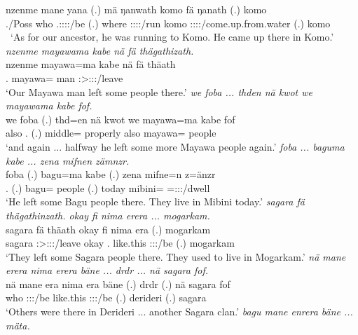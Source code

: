 \begin{exe}
	\gll nzenme mane yana (.) mä ŋanwath komo fä ŋanath (.) komo\\ 
	\Fnsg./Poss{} who \Tsg.\Masc:\Sbj:\Pst:\Ipfv:\Venit/be (.) where \Stpl:\Sbj:\Pst:\Ipfv:\Venit/run komo \Dist{} \Stpl:\Sbj:\Pst:\Ipfv:\Venit/come.up.from.water (.) komo\\\
	\trans `As for our ancestor, he was running to Komo. He came up there in Komo.'
\exi{85} 
	\emph{nzenme mayawama kabe nä fä thägathizath.}\\
	\gll nzenme mayawa=ma kabe nä fä thäath\\ 
	\Fnsg.\Poss{} mayawa=\Char{} man \Indf{} \Dist{} \Stpl:\Sbj>\Stpl:\Obj:\Pst:\Pfv/leave\\
	\trans `Our Mayawa man left some people there.'
	\emph{we foba ... thden nä kwot we mayawama kabe fof.}\\
	\gll we foba (.) thd=en nä kwot we mayawa=ma kabe fof\\ 
	also \Dist.\Abl{} (.) middle=\Loc{} \Indf{} properly also mayawa=\Char{} people \Emph\\
	\trans `and again ... halfway he left some more Mayawa people again.'
\exi{87} 
	\emph{foba ... baguma kabe ... zena mifnen zämnzr.}\\
	\gll foba (.) bagu=ma kabe (.) zena mifne=n z=änzr\\ 
	\Dist.\Abl{} (.) bagu=\Char{} people (.) today mibini=\Loc{} \Prox=\Stpl:\Sbj:\Nonpast:\Ipfv/dwell\\
	\trans `He left some Bagu people there. They live in Mibini today.'
\exi{88} 
	\emph{sagara fä thägathinzath. okay fi nima erera ... mogarkam.}\\
	\gll sagara fä thä\stem{gathinz}ath okay fi nima e\stem{rä}ra (.) mogarkam\\ 
	sagara \Dist{} \Stpl:\Sbj>\Stpl:\Obj:\Pst:\Ipfv/leave okay \Third.\Abs{} like.this \Stpl:\Sbj:\Pst:\Ipfv/be (.) mogarkam\\
	\trans `They left some Sagara people there. They used to live in Mogarkam.'
\exi{89} 
	\emph{nä mane erera nima erera bäne ... drdr ... nä sagara fof.}\\
	\gll nä mane era nima e\stem{rä}ra bäne (.) drdr (.) nä sagara fof\\ 
	\Indf{} who \Stpl:\Sbj:\Pst:\Ipfv/be like.this \Stpl:\Sbj:\Pst:\Ipfv/be \Recog{} (.) derideri (.) \Indf{} sagara \Emph\\
	\trans `Others were there in Derideri ... another Sagara clan.'
\exi{90} 
	\emph{bagu mane enrera bäne ... mäta.}\\

\end{exe}
